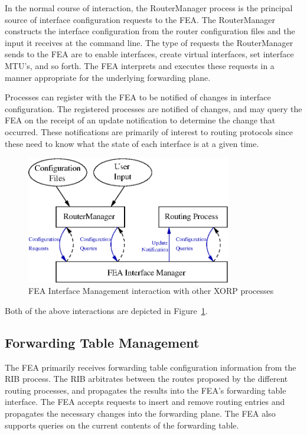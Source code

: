 \documentclass[11pt]{article}
\begin{document}
In the normal course of interaction, the RouterManager process is the
principal source of interface configuration requests to the FEA.  The
RouterManager constructs the interface configuration from the router
configuration files and the input it receives at the command line.
The type of requests the RouterManager sends to the FEA are to enable
interfaces, create virtual interfaces, set interface MTU's, and so
forth.  The FEA interprets and executes these requests in a manner
appropriate for the underlying forwarding plane.

Processes can register with the FEA to be notified of changes in
interface configuration.  The registered processes are notified of
changes, and may query the FEA on the receipt of an update notification
to determine the change that occurred.  These notifications are
primarily of interest to routing protocols since these need to know
what the state of each interface is at a given time.

\begin{figure}[htbp]
  \begin{center}
    \includegraphics[width=0.80\textwidth]{figs/ifmgmt}
    \caption{FEA Interface Management interaction with other XORP processes}
    \label{fig:ifmgmt}
  \end{center}
\end{figure}

Both of the above interactions are depicted in Figure~\ref{fig:ifmgmt}.

\subsection{Forwarding Table Management}
\label{sec:introduction:forwarding_table_management}

The FEA primarily receives forwarding table configuration information from the
RIB process.  The RIB arbitrates between the routes proposed by the
different routing processes, and propagates the results into the FEA's
forwarding table interface.  The FEA accepts requests to insert and
remove routing entries and propagates the necessary changes into the
forwarding plane.  The FEA also supports queries on the current
contents of the forwarding table.
\end{document}
